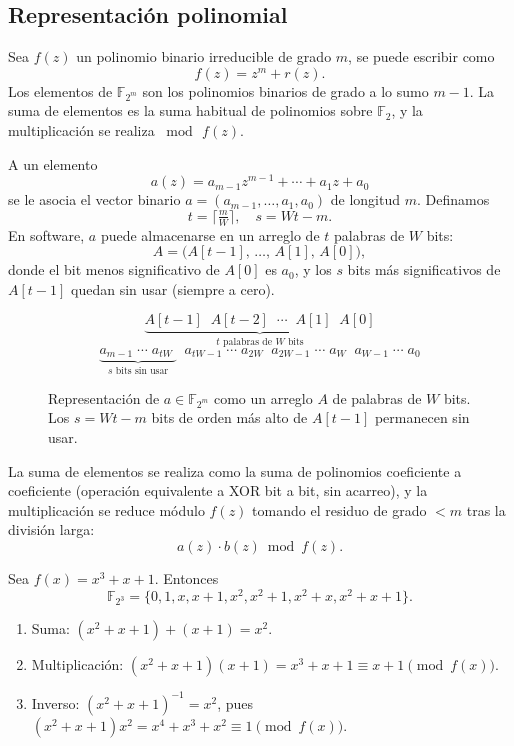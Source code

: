 \subsection{Representación polinomial}
Sea \(f(z)\) un polinomio binario irreducible de grado \(m\), se puede escribir como
\[
  f(z) = z^m + r(z).
\]
Los elementos de \(\mathbb{F}_{2^m}\) son los polinomios binarios de grado a lo sumo \(m-1\). La suma de elementos es la suma habitual de polinomios sobre \(\mathbb{F}_2\), y la multiplicación se realiza \(\bmod\,f(z)\).

A un elemento
\[
  a(z) = a_{m-1}z^{m-1} + \cdots + a_1 z + a_0
\]
se le asocia el vector binario
\(\displaystyle a = (a_{m-1},\dots,a_1,a_0)\) de longitud \(m\). Definamos
\[
  t = \bigl\lceil\tfrac{m}{W}\bigr\rceil,
  \quad
  s = Wt - m.
\]
En software, \(a\) puede almacenarse en un arreglo de \(t\) palabras de \(W\) bits:
\[
  A = \bigl(A[t-1],\,\dots,\,A[1],\,A[0]\bigr),
\]
donde el bit menos significativo de \(A[0]\) es \(a_0\), y los \(s\) bits más significativos de \(A[t-1]\) quedan sin usar (siempre a cero).

\begin{figure}[H]
\[
\underbrace{A[t-1]\;\;A[t-2]\;\;\cdots\;\;A[1]\;\;A[0]}_{\text{\(t\) palabras de \(W\) bits}}
\]
\[
\underbrace{a_{m-1}\;\cdots\;a_{tW}\;}_{s\text{ bits sin usar}}\;\;
a_{tW-1}\;\cdots\;a_{2W}\;\;
a_{2W-1}\;\cdots\;a_{W}\;\;
a_{W-1}\;\cdots\;a_{0}
\]
\caption{Representación de \(a\in\mathbb{F}_{2^m}\) como un arreglo \(A\) de palabras de \(W\) bits. Los \(s = Wt - m\) bits de orden más alto de \(A[t-1]\) permanecen sin usar.}
\label{fig:word_representation}
\end{figure}

La suma de elementos se realiza como la suma de polinomios coeficiente a coeficiente (operación equivalente a XOR bit a bit, sin acarreo), y la multiplicación se reduce módulo \(f(z)\) tomando el residuo de grado \(<m\) tras la división larga:
\[
  a(z)\cdot b(z)\bmod f(z).
\]

\begin{ejemplo}\label{ej:F8}
Sea $f(x)=x^3+x+1$. Entonces
\[
  \mathbb{F}_{2^3}=\{0,1,x,x+1,x^2,x^2+1,x^2+x,x^2+x+1\}.
\]
\begin{enumerate}
  \item Suma: $(x^2+x+1)+(x+1)=x^2$.
  \item Multiplicación: $(x^2+x+1)(x+1)=x^3+x+1\equiv x+1\pmod{f(x)}$.
  \item Inverso: $(x^2+x+1)^{-1}=x^2$, pues $(x^2+x+1)x^2=x^4+x^3+x^2\equiv1\pmod{f(x)}$.
\end{enumerate}
\end{ejemplo}

